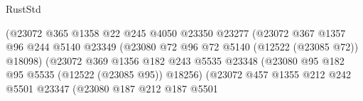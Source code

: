 \begin{lexlean}{RustStd}
\begin{coremodule}
                                          (@23072
                                            @365
                                            @1358
                                            @22
                                            @245
                                            @4050
                                            @23350
                                            @23277
                                            (@23072
                                              @367
                                              @1357
                                              @96
                                              @244
                                              @5140
                                              @23349
                                              (@23080
                                                @72
                                                @96
                                                @72
                                                @5140
                                                (@12522 (@23085 @72))
                                                @18098)
                                              (@23072
                                                @369
                                                @1356
                                                @182
                                                @243
                                                @5535
                                                @23348
                                                (@23080
                                                  @95
                                                  @182
                                                  @95
                                                  @5535
                                                  (@12522 (@23085 @95))
                                                  @18256)
                                                (@23072
                                                  @457
                                                  @1355
                                                  @212
                                                  @242
                                                  @5501
                                                  @23347
                                                  (@23080
                                                    @187
                                                    @212
                                                    @187
                                                    @5501

\end{coremodule}
\end{lexlean}
